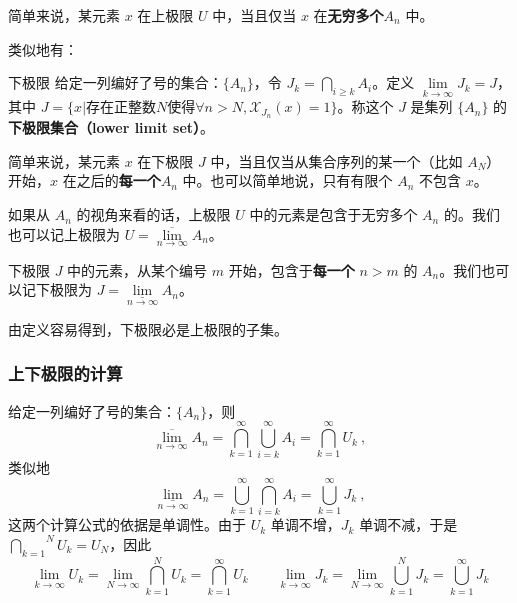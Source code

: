 简单来说，某元素 $x$ 在上极限 $U$ 中，当且仅当 $x$ 在\textbf{无穷多个}$A_n$ 中。

类似地有：

\begin{definition}{下极限}
给定一列编好了号的集合：$\{A_n\}$，令 $J_k=\underset{i\ge k}{\bigcap} A_i$。定义 $\lim\limits_{k\to\infty} J_k=J$，其中 $J=\{x|\text{存在正整数}N\text{使得}\forall n>N, \mathcal{X}_{J_n}(x)=1\}$。称这个 $J$ 是集列 $\{A_n\}$ 的\textbf{下极限集合（lower limit set）}。
\end{definition}

简单来说，某元素 $x$ 在下极限 $J$ 中，当且仅当从集合序列的某一个（比如 $A_N$）开始，$x$ 在之后的\textbf{每一个}$A_n$ 中。也可以简单地说，只有有限个 $A_n$ 不包含 $x$。

如果从 $A_n$ 的视角来看的话，上极限 $U$ 中的元素是包含于无穷多个 $A_n$ 的。我们也可以记上极限为 $U=\underset{n\to \infty}{\overline{\lim}} A_n$。

下极限 $J$ 中的元素，从某个编号 $m$ 开始，包含于\textbf{每一个} $n>m$ 的 $A_n$。我们也可以记下极限为 $J=\underset{n\to \infty}{\underline{\lim}}A_n$。

由定义容易得到，下极限必是上极限的子集。

\subsubsection{上下极限的计算}
给定一列编好了号的集合：$\{A_n\}$，则
\begin{equation}
\underset{n\to \infty}{\overline{\lim}} A_n = \overset {\infty}{\underset{k=1}{\bigcap}} \overset{\infty}{\underset{i=k}{\bigcup}} A_i = \overset{\infty}{\underset{k=1}{\bigcap}} U_k~,
\end{equation}
类似地
\begin{equation}
\underset{n\to \infty}{\underline{\lim}}A_n=\overset{\infty}{\underset{k=1}{\bigcup}}\overset{\infty}{\underset{i=k}{\bigcap}} A_i=\overset{\infty} {\underset{k=1}{\bigcup}} J_k~,
\end{equation}
这两个计算公式的依据是单调性。由于 $U_k$ 单调不增，$J_k$ 单调不减，于是 $\displaystyle \overset{N}{\underset{k=1}{\bigcap}}U_k=U_N$，因此
\begin{equation}
\lim_{k\to\infty}U_k=\lim\limits_{N\to\infty}\overset{N}{\underset{k=1}{\bigcap}} U_k=\overset{\infty}{\underset{k=1}{\bigcap}}U_k
\qquad
\lim\limits_{k\to\infty}J_k=\lim\limits_{N\to\infty}\overset{N}{\underset{k=1}{\bigcup}} J_k=\overset{\infty}{\underset{k=1}{\bigcup}} J_k
\end{equation}

